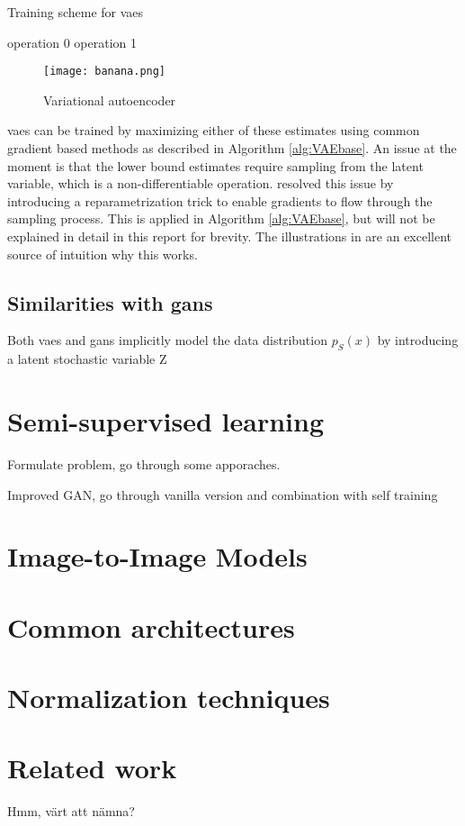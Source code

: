 \begin{algorithm}
    \caption{Training scheme for \acrlong{vaes}}
  \label{alg:VAEbase}
  \begin{algorithmic}[1]
    \STATE operation 0 \label{op0}
    \STATE operation 1 \label{op1}
  \end{algorithmic}
\end{algorithm}

\begin{figure}
    \caption{Variational autoencoder}
    \label{fig:VAE}
    \centering
    \texttt{[image: banana.png]}
\end{figure}

\acrshort{vaes} can be trained by maximizing either of these estimates using common gradient based methods as described in Algorithm \ref{alg:VAEbase}. An issue at the moment is that the lower bound estimates require sampling from the latent variable, which is a non-differentiable operation. \textcite{kingma2013auto} resolved this issue by introducing a reparametrization trick to enable gradients to flow through the sampling process. This is applied in Algorithm \ref{alg:VAEbase}, but will not be explained in detail in this report for brevity. The illustrations in \parencite{doersch2016tutorial} are an excellent source of intuition why this works.

\subsection{Similarities with \acrshort{gans}}
Both \acrshort{vaes} and \acrshort{gans} implicitly model the data distribution $p_S(x)$ by introducing a latent stochastic variable Z


\section{Semi-supervised learning}
Formulate problem, go through some apporaches.

Improved GAN, go through vanilla version and combination with self training \cite{wuliu2017selftrainsemisup}

\section{Image-to-Image Models}

\section{Common architectures}

\section{Normalization techniques}

\section{Related work}
Hmm, värt att nämna? 






